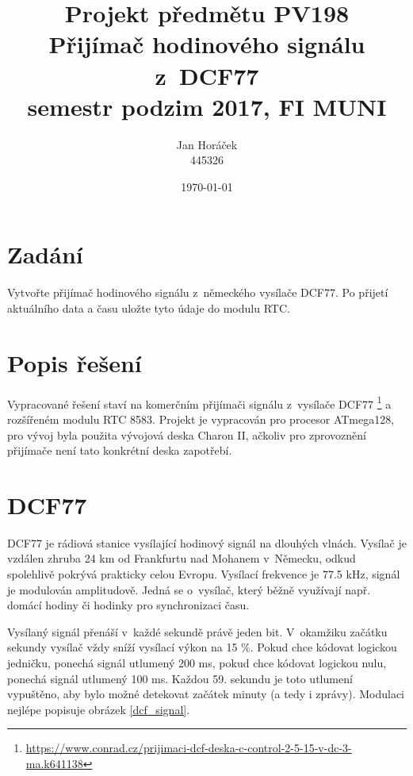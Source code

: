 \documentclass[12pt,a4paper]{article}
\begin{document}
\setcounter{page}{1}  %

\title{\normalsize Projekt předmětu PV198 \\ \huge Přijímač hodinového signálu z DCF77 \\ \normalsize semestr podzim 2017, FI MUNI}
\author{Jan Horáček\\
	445326}
\date{\today}
\maketitle

\section{Zadání}

Vytvořte přijímač hodinového signálu z~německého vysílače DCF77. Po přijetí
aktuálního data a času uložte tyto údaje do modulu RTC.

\section{Popis řešení}

Vypracované řešení staví na komerčním přijímači signálu z vysílače DCF77
\footnote{\href{https://www.conrad.cz/prijimaci-dcf-deska-c-control-2-5-15-v-dc-3-ma.k641138}{https://www.conrad.cz/prijimaci-dcf-deska-c-control-2-5-15-v-dc-3-ma.k641138}}
a rozšířeném modulu RTC 8583. Projekt je vypracován pro procesor ATmega128,
pro vývoj byla použita vývojová deska Charon II, ačkoliv pro zprovoznění
přijímače není tato konkrétní deska zapotřebí.

\section{DCF77}

DCF77 je rádiová stanice vysílající hodinový signál na dlouhých vlnách.
Vysílač je vzdálen zhruba 24 km od Frankfurtu nad Mohanem v Německu, odkud
spolehlivě pokrývá prakticky celou Evropu. Vysílací frekvence je 77.5 kHz,
signál je modulován amplitudově. Jedná se o~vysílač, který běžně využívají
např. domácí hodiny či hodinky pro synchronizaci času.

Vysílaný signál přenáší v~každé sekundě právě jeden bit. V~okamžiku začátku
sekundy vysílač vždy sníží vysílací výkon na 15 \%. Pokud chce kódovat
logickou jedničku, ponechá signál utlumený 200 ms, pokud chce kódovat logickou
nulu, ponechá signál utlumený 100 ms. Každou 59. sekundu je toto utlumení
vypuštěno, aby bylo možné detekovat začátek minuty (a tedy i zprávy). Modulaci
nejlépe popisuje obrázek
\ref{dcf_signal}.
\end{document}
